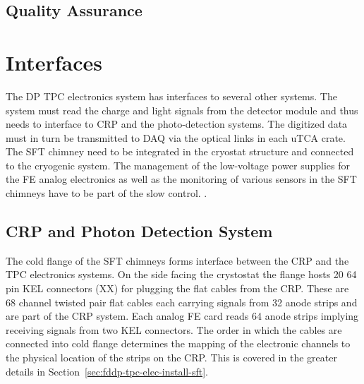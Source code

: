 \subsection{Quality Assurance}
\label{sec:fddp-tpc-elec-qa}



\section{Interfaces}
\label{sec:fddp-tpc-elec-intfc}

The DP TPC electronics system has interfaces to several other systems. The system must read the charge and light signals from the detector module and thus needs to interface to CRP and the photo-detection systems.  The digitized data must in turn be transmitted to DAQ via the optical links in each uTCA crate. The SFT chimney need to be integrated in the cryostat structure and connected to the cryogenic system. The management of the low-voltage power supplies for the FE analog electronics as well as the monitoring of various sensors in the SFT chimneys have to be part of the slow control. 
. 

\subsection{CRP and Photon Detection System}
\label{sec:fddp-tpc-elec-intfc-crppmt}

The cold flange of the SFT chimneys forms interface between the CRP and the TPC electronics systems. On the side facing the crystostat the flange hosts \num{20} \num{64} pin KEL connectors (XX) for plugging the flat cables from the CRP. These are 68 channel twisted pair flat cables each carrying signals from \num{32} anode strips and are part of the CRP system. Each analog FE card reads \num{64} anode strips implying receiving signals from two KEL connectors. The order in which the cables are connected into cold flange determines the mapping of the electronic channels to the physical location of the strips on the CRP. This is covered in the greater details in Section~\ref{sec:fddp-tpc-elec-install-sft}. 


